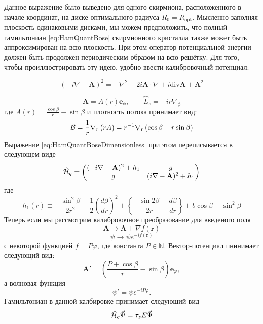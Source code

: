 \documentclass[a4paper,article,14pt]{extarticle}
\begin{document}
Данное выражение было выведено для одного скирмиона, расположенного в начале координат, на диске оптимального радиуса $R_0=R_\text{opt}$. Мысленно заполняя плоскость одинаковыми дисками, мы можем предположить, что полный гамильтониан \eqref{eq:HamQuantBose} скирмионного кристалла также может быть аппроксимирован на всю плоскость. При этом оператор потенциальной энергии должен быть продолжен периодическим образом на всю решётку. Для того, чтобы проиллюстрировать эту идею, удобно ввести калибровочный потенциал:


\begin{equation}
(- i \nabla - \mathbf{A} ) ^ 2 = - \nabla ^ 2 + 2 i \mathbf{A} \cdot \nabla + i \text{div} \mathbf{A}  + \mathbf{A}^2
\end{equation}

$$
\mathbf{A} = A(r) \mathbf{e}_\phi ,  \qquad  \hat{L}_{z} = - i r \nabla_\phi
$$
где $A(r) = \frac{ \cos\beta } { r } - \sin \beta$ и плотность потока принимает вид:
$$
{\cal B}  = \frac 1 r \nabla_r \left(r A \right) = 
r^{-1}  \nabla_r \left(\cos\beta   -  r  \sin \beta \right)  
$$
Выражение \eqref{eq:HamQuantBoseDimensionless} при этом переписывается в следующем виде
\begin{equation}
\hat {\cal H}_{q} =\begin{pmatrix} (- i \nabla - \mathbf{A} ) ^ 2 + h_1 & g \\ g & ( i \nabla - \mathbf{A} ) ^ 2 + h_1 \end{pmatrix}
\end{equation}
где
\begin{equation}
h_1(r) \equiv  -\frac{\sin^2 \beta }{2r^2} - \frac{1}{2}\left( \frac{d\beta }{dr} \right)^2 +  \left\{  - \frac{\sin 2\beta }{2r}  - \frac{d\beta }{dr} \right\} + b\cos \beta - \sin ^ 2 \beta
\end{equation}
Теперь если мы рассмотрим калибровочное преобразование для введеного поля 
$$
\mathbf{A} \rightarrow \mathbf{A} + \nabla f(\mathbf{r})
$$
$$
\psi \rightarrow \psi e ^ {- i f(\mathbf{r})}
$$
с некоторой функцией  $f = P \varphi$, где константа $P \in \mathbb{N}$. Вектор-потенциал пнинимает следующий вид:
$$
\mathbf{A'}= \left(\frac {P + \cos{\beta}} {r} - \sin{\beta} \right) \mathbf{e}_\varphi,
$$
а волновая функция
$$
\psi' = \psi e^{-i P \varphi}.
$$
Гамильтониан в данной калбировке принимает следующий вид
\begin{equation}
\label{eq:init_ham_landau}
\hat {\cal H}_{q} \vec{\Psi} = \tau_z E \vec{\Psi}
\end{equation}
\end{document}

